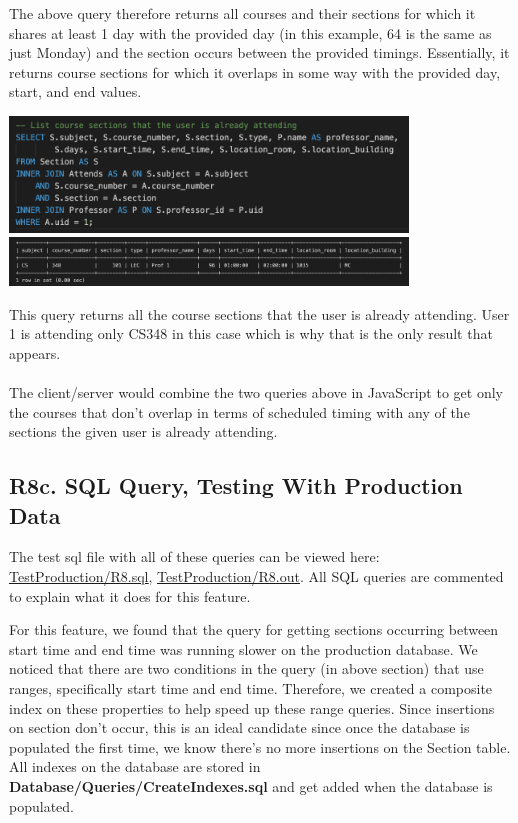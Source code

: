 \documentclass[12pt, a4paper]{article}
\begin{document}
The above query therefore returns all courses and their sections for which it shares at least 1 day with the provided day (in this example, 64 is the same as just Monday) and the section occurs between the provided timings. Essentially, it returns course sections for which it overlaps in some way with the provided day, start, and end values.

\begin{center}
    \includegraphics[width=400px]{R8/q2}
    \includegraphics[width=400px]{R8/q2out}
\end{center}
This query returns all the course sections that the user is already attending. User 1 is attending only CS348 in this case which is why that is the only result that appears.\\\\
The client/server would combine the two queries above in JavaScript to get only the courses that don't overlap in terms of scheduled timing with any of the sections the given user is already attending.
\subsection*{R8c. SQL Query, Testing With Production Data}
The test sql file with all of these queries can be viewed here: \underline{\href{https://github.com/Kggupta/DegreeMap/tree/main/Database/Queries/TestProduction}{TestProduction/R8.sql}}, \underline{\href{https://github.com/Kggupta/DegreeMap/tree/main/Database/Queries/TestProduction}{TestProduction/R8.out}}. All SQL queries are commented to explain what it does for this feature.

For this feature, we found that the query for getting sections occurring between start time and end time was running slower on the production database. We noticed that there are two conditions in the query (in above section) that use ranges, specifically start time and end time. Therefore, we created a composite index on these properties to help speed up these range queries. Since insertions on section don't occur, this is an ideal candidate since once the database is populated the first time, we know there's no more insertions on the Section table.
All indexes on the database are stored in \textbf{Database/Queries/CreateIndexes.sql} and get added when the database is populated.
\end{document}
